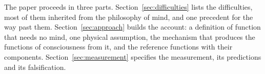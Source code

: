 The paper proceeds in three parts. Section~\ref{sec:difficulties} lists the difficulties, most of them
inherited from the philosophy of mind, and one precedent for the way past them.
Section~\ref{sec:approach} builds the account: a definition of function that needs no mind, one
physical assumption, the mechanism that produces the functions of consciousness from it, and the
reference functions with their components. Section~\ref{sec:measurement} specifies the measurement,
its predictions and its falsification.
